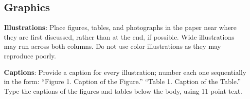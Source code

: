 \documentclass[11pt]{article}
\begin{document}
\subsection{Graphics}

{\bf Illustrations}: Place figures, tables, and photographs in the
paper near where they are first discussed, rather than at the end, if
possible.  Wide illustrations may run across both columns. Do not use
color illustrations as they may reproduce poorly.

{\bf Captions}: Provide a caption for every illustration; number each one
sequentially in the form:  ``Figure 1. Caption of the Figure.'' ``Table 1.
Caption of the Table.''  Type the captions of the figures and 
tables below the body, using 11 point text.  




\end{document}
